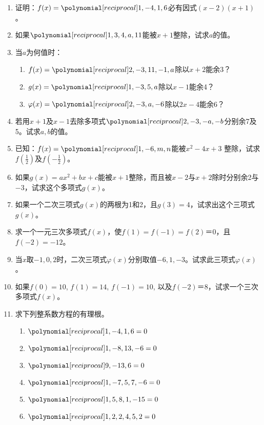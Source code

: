 \begin{enumerate}
\item 证明：$f(x)=\poly{1,-4,1,6}$必有因式$(x-2)(x+1)$。
\item 如果$\poly{1,3,4,a,11}$能被$x+1$整除，试求$a$的值。
\item 当$a$为何值时：
\begin{enumerate}
    \item $f(x)=\poly{2,-3,11,-1,a}$除以$x+2$能余3？
    \item $g(x)=\poly{1,-3,5,a}$除以$x-1$能余4？
    \item $\varphi(x)=\poly{2,-3,a,-6}$除以$2x-4$能余6？
\end{enumerate}

\item 若用$x+1$及$x-1$去除多项式$\poly{2,-3,-a,-b}$分别余7及5。试求$a,b$的值。

\item 已知：$f(x)=\poly{1,-6,m,n}$能被$x^2-4x+3$
整除，试求$f\left(\frac{1}{2}\right)$及$f\left(-\frac{1}{2}\right)$。

\item 如果$g(x)=ax^2+bx+c$能被$x+1$整除，而且被$x-2$与$x+2$除时分别余2与$-3$，试求这个多项式$g(x)$。

\item 如果一个二次三项式$g(x)$的两根为1和2，且$g(3)=4$，试求出这个三项式$g(x)$。

\item 求一个一元三次多项式$f(x)$，使$f(1)=f(-1)=f(2)＝0$，且$f(-2)=-12$。
\item 当$x$取$-1, 0, 2$时，二次三项式$\varphi(x)$分别取值$-6,1,-3$。试求此三项式$\varphi(x)$。
\item 如果$f(0)=10$, $f(1)=14$, $f(-1)=10$, 以及$f(-2)＝8$，试求一个三次多项式$f(x)$。

\item 求下列整系数方程的有理根。
\begin{multicols}{2}
    \begin{enumerate}
    \item $\poly{1,-4,1,6}=0$
    \item $\poly{1,-8,13,-6}=0$
    \item $\poly{9,-13,6}=0$
    \item $\poly{1,-7,5,7,-6}=0$
    \item $\poly{1,5,8,1,-15}=0$
    \item $\poly{1,2,2,4,5,2}=0$
\end{enumerate}
\end{multicols}


\end{enumerate}
